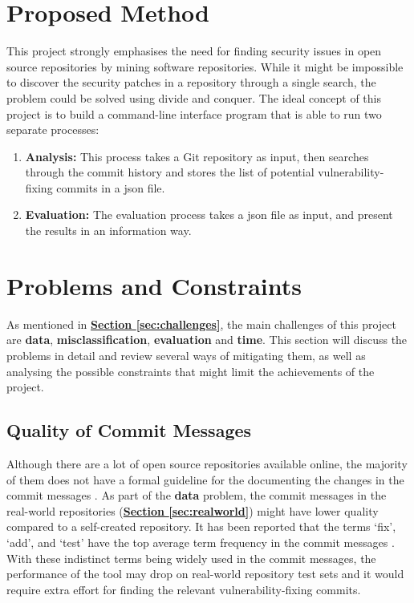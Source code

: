 \documentclass[12pt, a4paper]{report}
\begin{document}
\section{Proposed Method} \label{sec:proposed_method}
This project strongly emphasises the need for finding security issues in open source repositories by
mining software repositories. While it might be impossible to discover the security patches in a
repository through a single search, the problem could be solved using divide and conquer. The ideal
concept of this project is to build a command-line interface program that is able to run two
separate processes:
\begin{enumerate}
  \item \textbf{Analysis:} This process takes a Git repository as input, then searches through the
  commit history and stores the list of potential vulnerability-fixing commits in a \acrshort{json}
  file.
  \item \textbf{Evaluation:} The evaluation process takes a \acrshort{json} file as input, and
  present the results in an information way.
\end{enumerate}

\section{Problems and Constraints} \label{sec:problems_and_constraints}
As mentioned in \hyperref[sec:challenges]{\textbf{Section \ref*{sec:challenges}}}, the main
challenges of this project are \textbf{data}, \textbf{misclassification}, \textbf{evaluation} and
\textbf{time}. This section will discuss the problems in detail and review several ways of
mitigating them, as well as analysing the possible constraints that might limit the achievements of
the project.

\subsection{Quality of Commit Messages} \label{subsec:commit_quality}
Although there are a lot of open source repositories available online, the majority of them does not
have a formal guideline for the documenting the changes in the commit messages \cite{bird_2009}. As
part of the \textbf{data} problem, the commit messages in the real-world repositories
(\hyperref[sec:realworld]{\textbf{Section \ref*{sec:realworld}}}) might have lower quality compared
to a self-created repository. It has been reported that the terms `fix', `add', and `test' have the
top average term frequency in the commit messages \cite{alali_2008}. With these indistinct terms
being widely used in the commit messages, the performance of the tool may drop on real-world
repository test sets and it would require extra effort for finding the relevant vulnerability-fixing
commits.
\end{document}
